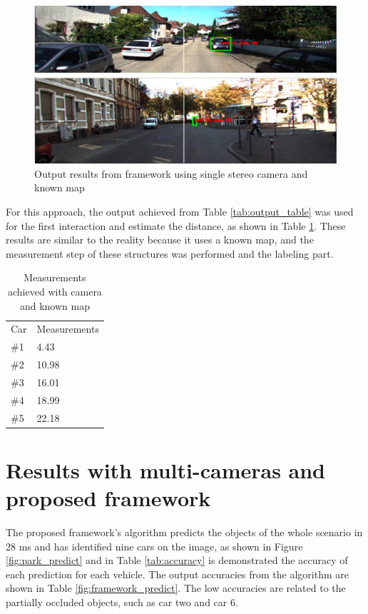 \begin{figure}[H]
\centering
\includegraphics[width=\textwidth]{imagens/ouput.png}
\caption{Output results from framework using single stereo camera and known map}
\label{fig:output}
\end{figure}

For this approach, the output achieved from Table \ref{tab:output_table} was used for the first interaction and estimate the distance, as shown in Table \ref{tab:output_2}. These results are similar to the reality because it uses a known map, and the measurement step of these structures was performed and the labeling part.

\begin{table}[H]
\centering
\caption{Measurements achieved with camera and known map}
\begin{tabular}{l|l} 
\toprule
Car &  Measurements      \\
\#1   & 4.43        \\
\#2   & 10.98       \\
\#3   & 16.01       \\
\#4   & 18.99       \\
\#5   & 22.18       \\
\bottomrule
\end{tabular}
\label{tab:output_2}
\end{table} 


\section{Results with multi-cameras and proposed framework}


The proposed framework's algorithm predicts the objects of the whole scenario in 28 ms and has identified nine cars on the image, as shown in Figure \ref{fig:park_predict} and in Table \ref{tab:accuracy} is demonstrated the accuracy of each prediction for each vehicle. The output accuracies from the algorithm are shown in Table \ref{fig:framework_predict}. The low accuracies are related to the partially occluded objects, such as car two and car 6. 

